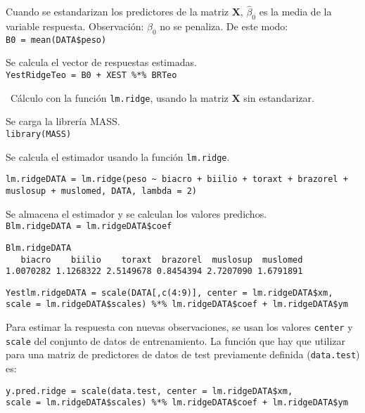 \documentclass[a4paper,12pt]{report}
\begin{document}
Cuando se estandarizan los predictores de la matriz $\boldsymbol{X}$, $\hat{\beta}_0$ es la media de la variable respuesta. Observación: $\beta_0$ no se penaliza. De este modo:\\
\texttt{B0 = mean(DATA\$peso)}

Se calcula el vector de respuestas estimadas.\\
\texttt{YestRidgeTeo = B0 + XEST \%*\% BRTeo}

\newpage

\textbullet\ Cálculo con la función \texttt{lm.ridge}, usando la matriz $\boldsymbol{X}$ sin estandarizar.
\vspace{0.4cm}

Se carga la librería MASS.\\
\texttt{library(MASS)}

Se calcula el estimador usando la función \texttt{lm.ridge}.

{
\begin{verbatim}
lm.ridgeDATA = lm.ridge(peso ~ biacro + biilio + toraxt + brazorel + 
muslosup + muslomed, DATA, lambda = 2)
\end{verbatim}
}

Se almacena el estimador y se calculan los valores predichos.\\
\texttt{Blm.ridgeDATA = lm.ridgeDATA\$coef}

{
\begin{verbatim}
Blm.ridgeDATA
   biacro    biilio    toraxt  brazorel  muslosup  muslomed 
1.0070282 1.1268322 2.5149678 0.8454394 2.7207090 1.6791891
\end{verbatim}
}

{
\begin{verbatim}
Yestlm.ridgeDATA = scale(DATA[,c(4:9)], center = lm.ridgeDATA$xm, 
scale = lm.ridgeDATA$scales) %*% lm.ridgeDATA$coef + lm.ridgeDATA$ym
\end{verbatim}
}

Para estimar la respuesta con nuevas observaciones, se usan los valores \texttt{center} y \texttt{scale} del conjunto de datos de entrenamiento. La función que hay que utilizar para una matriz de predictores de datos de test previamente definida (\texttt{data.test}) es:

{
\begin{verbatim}
y.pred.ridge = scale(data.test, center = lm.ridgeDATA$xm, 
scale = lm.ridgeDATA$scales) %*% lm.ridgeDATA$coef + lm.ridgeDATA$ym
\end{verbatim}
}
\end{document}
